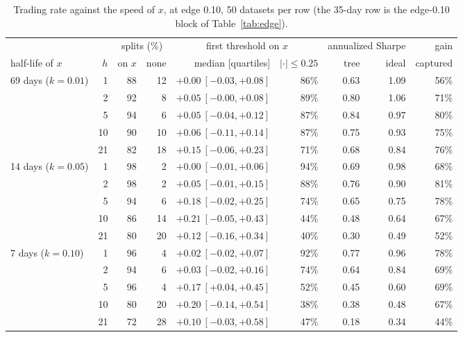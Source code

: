 \documentclass[11pt,a4paper]{article}
\newcommand{\1}{\mathbf{1}}
\begin{document}
\begin{table}[H]
\centering\small
\setlength{\tabcolsep}{4.5pt}
\begin{tabular}{@{}l r rr r r rr r@{}}
\toprule
& & \multicolumn{2}{c}{splits (\%)} & \multicolumn{2}{c}{first threshold on $x$} & \multicolumn{2}{c}{annualized Sharpe} & gain\\
\cmidrule(lr){3-4}\cmidrule(lr){5-6}\cmidrule(lr){7-8}
half-life of $x$ & $h$ & on $x$ & none & median [quartiles] & $|\cdot|\le0.25$ & tree & ideal & captured\\
\midrule
69 days ($k=0.01$) & 1 & 88 & 12 & $+0.00\ [-0.03,+0.08]$ & 86\% & 0.63 & 1.09 & 56\%\\
 & 2 & 92 & 8 & $+0.05\ [-0.00,+0.08]$ & 89\% & 0.80 & 1.06 & 71\%\\
 & 5 & 94 & 6 & $+0.05\ [-0.04,+0.12]$ & 87\% & 0.84 & 0.97 & 80\%\\
 & 10 & 90 & 10 & $+0.06\ [-0.11,+0.14]$ & 87\% & 0.75 & 0.93 & 75\%\\
 & 21 & 82 & 18 & $+0.15\ [-0.06,+0.23]$ & 71\% & 0.68 & 0.84 & 76\%\\
\midrule
14 days ($k=0.05$) & 1 & 98 & 2 & $+0.00\ [-0.01,+0.06]$ & 94\% & 0.69 & 0.98 & 68\%\\
 & 2 & 98 & 2 & $+0.05\ [-0.01,+0.15]$ & 88\% & 0.76 & 0.90 & 81\%\\
 & 5 & 94 & 6 & $+0.18\ [-0.02,+0.25]$ & 74\% & 0.65 & 0.75 & 78\%\\
 & 10 & 86 & 14 & $+0.21\ [-0.05,+0.43]$ & 44\% & 0.48 & 0.64 & 67\%\\
 & 21 & 80 & 20 & $+0.12\ [-0.16,+0.34]$ & 40\% & 0.30 & 0.49 & 52\%\\
\midrule
7 days ($k=0.10$) & 1 & 96 & 4 & $+0.02\ [-0.02,+0.07]$ & 92\% & 0.77 & 0.96 & 78\%\\
 & 2 & 94 & 6 & $+0.03\ [-0.02,+0.16]$ & 74\% & 0.64 & 0.84 & 69\%\\
 & 5 & 96 & 4 & $+0.17\ [+0.04,+0.45]$ & 52\% & 0.45 & 0.60 & 69\%\\
 & 10 & 80 & 20 & $+0.20\ [-0.14,+0.54]$ & 38\% & 0.38 & 0.48 & 67\%\\
 & 21 & 72 & 28 & $+0.10\ [-0.03,+0.58]$ & 47\% & 0.18 & 0.34 & 44\%\\
\bottomrule
\end{tabular}
\caption{Trading rate against the speed of $x$, at edge 0.10, 50 datasets per row (the 35-day row is the edge-0.10 block of Table~\ref{tab:edge}).}
\label{tab:k}
\end{table}
\end{document}
